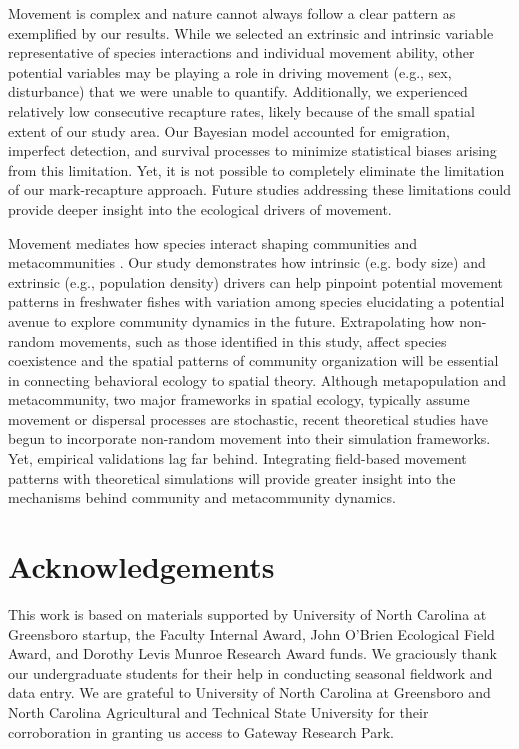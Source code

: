 \documentclass[11pt, class=article, crop=false]{standalone}
\begin{document}
Movement is complex and nature cannot always follow a clear pattern as exemplified by our results. While we selected an extrinsic and intrinsic variable representative of species interactions and individual movement ability, other potential variables may be playing a role in driving movement (e.g., sex, disturbance) that we were unable to quantify. Additionally, we experienced relatively low consecutive recapture rates, likely because of the small spatial extent of our study area. Our Bayesian model accounted for emigration, imperfect detection, and survival processes to minimize statistical biases arising from this limitation. Yet, it is not possible to completely eliminate the limitation of our mark-recapture approach. Future studies addressing these limitations could provide deeper insight into the ecological drivers of movement.

Movement mediates how species interact shaping communities and metacommunities \citep{schlagelMovementmediatedCommunityAssembly2020}. Our study demonstrates how intrinsic (e.g. body size) and extrinsic (e.g., population density) drivers can help pinpoint potential movement patterns in freshwater fishes with variation among species elucidating a potential avenue to explore community dynamics in the future. Extrapolating how non-random movements, such as those identified in this study, affect species coexistence and the spatial patterns of community organization will be essential in connecting behavioral ecology to spatial theory. Although metapopulation and metacommunity, two major frameworks in spatial ecology, typically assume movement or dispersal processes are stochastic, recent theoretical studies have begun to incorporate non-random movement into their simulation frameworks. Yet, empirical validations lag far behind. Integrating field-based movement patterns with theoretical simulations will provide greater insight into the mechanisms behind community and metacommunity dynamics.

\section*{Acknowledgements}

This work is based on materials supported by University of North Carolina at Greensboro startup, the Faculty Internal Award, John O'Brien Ecological Field Award, and Dorothy Levis Munroe Research Award funds. We graciously thank our undergraduate students for their help in conducting seasonal fieldwork and data entry. We are grateful to University of North Carolina at Greensboro and North Carolina Agricultural and Technical State University for their corroboration in granting us access to Gateway Research Park. 
\end{document}
